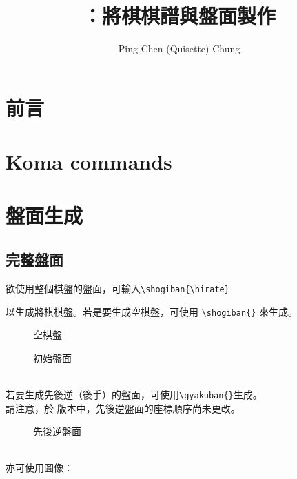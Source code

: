 \documentclass[a4paper, 10pt,]{article}
\begin{document}
\title{\RyuOhTeX：將棋棋譜與盤面製作}
\author{Ping-Chen (Quisette) Chung}

	\maketitle
	\tableofcontents

\setcounter{section}{-1}
\section{前言}
\newpage
\section{Koma commands}
\section{盤面生成}

\subsection{完整盤面}
欲使用整個棋盤的盤面，可輸入\verb|\shogiban{\hirate}|

以生成將棋棋盤。若是要生成空棋盤，可使用 \verb|\shogiban{}| 來生成。\\
\begin{figure}[h]
  \begin{minipage}[h]{0.5\linewidth}
    \centering
    \shogiban{}
    \caption{空棋盤}
    \label{fig:side:a}
  \end{minipage}%
  \begin{minipage}[h]{0.5\linewidth}
    \centering
    \shogiban{\hirate}
    \caption{初始盤面}
    \label{fig:side:b}
  \end{minipage}
\end{figure}\\
若要生成先後逆（後手）的盤面，可使用\verb|\gyakuban{}|生成。\\
請注意，於  版本中，先後逆盤面的座標順序尚未更改。
\begin{figure}[h]
    \centering
    \gyakuban{}
    \caption{先後逆盤面}
    \label{fig:my_label}
\end{figure}\\
亦可使用圖像：
\end{document}

